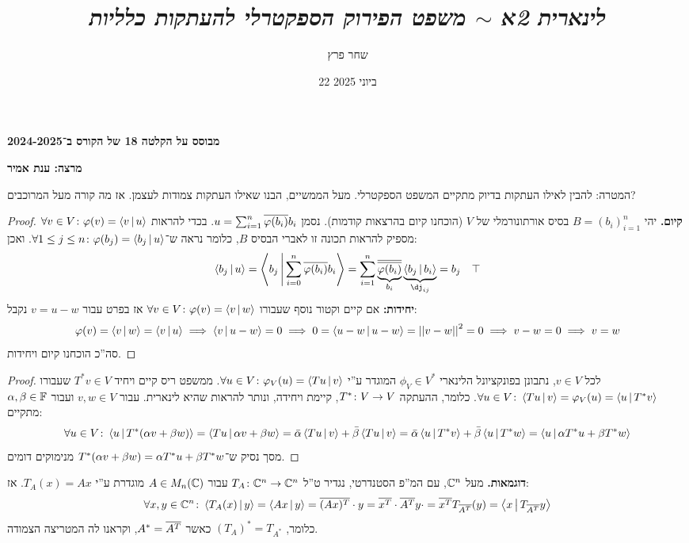 \documentclass[]{../../../../tex/classes/styledArticle}
\author{שחר פרץ}
\title{\textit{לינארית 2א $\sim$ משפט הפירוק הספקטרלי להעתקות כלליות}}
\date{22 ביוני 2025}
\begin{document}
	\maketitle
	\textbf{מבוסס על הקלטה 18 של הקורס ב־2024-2025}
	
	\textbf{מרצה: ענת אמיר}
	
	המטרה: להבין לאילו העתקות בדיוק מתקיים המשפט הספקטרלי. מעל הממשיים, הבנו שאילו העתקות צמודות לעצמן. אז מה קורה מעל המרוכבים? 
	
	\begin{proof}
		\textbf{קיום. }יהי $B = (b_i)_{i = 1}^{n}$ בסיס אורתונורמלי של $V$ (הוכחנו קיום בהרצאות קודמות). נסמן $u = \sum_{i =1}^{n}\overline{\varphi(b_i)} b_i$. בכדי להראות $\forall v \in V \colon \varphi(v) = \left \langle v \,\middle|\, u \right \rangle$ מספיק להראות תכונה זו לאברי הבסיס $B$, כלומר נראה ש־$\forall 1 \le j \le n \colon \varphi(b_j) = \left \langle b_j \,\middle|\, u \right \rangle$. ואכן: 
		\[ \mut{b_j}{u} = \mut{b_j}{\sumni \ol{\phi(b_i)}b_i} = \sum_{i = 1}^{n}\underbrace{\ol{\ol{\phi(b_i)}}}_{b_i}\underbrace{\mut{b_j}{b_i}}_{\dj_{ij}} = b_j \quad \top \]
		\textbf{יחידות: }אם קיים וקטור נוסף שעבורו $\forall v \in V \colon \varphi(v) = \left \langle v \,\middle|\, w \right \rangle$ אז בפרט עבור $v = u - w$ נקבל: 
		\[ \varphi(v) = \left \langle v \,\middle|\, w \right \rangle = \left \langle v \,\middle|\, u \right \rangle \implies \left \langle v \,\middle|\, u - w \right \rangle = 0 \implies 0 = \left \langle u - w \,\middle|\, u - w \right \rangle = \left \vert \left \vert v - w \right \vert \right \vert^{2} = 0 \implies v - w = 0 \implies v = w \]
		סה''כ הוכחנו קיום ויחידות. 
	\end{proof}
	
	\begin{proof}
		לכל $v \in V$, נתבונן בפונקציונל הלינארי $\phi_V \in V^*$ המוגדר ע''י $\forall u \in V \colon \varphi_V(u) = \left \langle Tu \,\middle|\, v \right \rangle$. ממשפט ריס קיים ויחיד $T^*v \in V$ שעבורו $\forall u \in V \colon \left \langle Tu \,\middle|\, v \right \rangle = \varphi_V(u) = \left \langle u \,\middle|\, T^*v \right \rangle$. כלומר, ההעתקה $T^* \colon V \to V$, קיימת ויחידה, ונותר להראות שהיא לינארית. עבור $v, w \in V$ ועבור $\alpha, \beta \in \mathbb{F}$ מתקיים: 
		\[ \forall u \in V \colon \left \langle u \,\middle|\, T^* (\alpha v + \beta w) \right \rangle = \left \langle Tu \,\middle|\, \alpha v + \beta w \right \rangle = \bar {\alpha} \left \langle Tu \,\middle|\, v \right \rangle + \bar {\beta} \left \langle Tu \,\middle|\, v \right \rangle = \bar {\alpha} \left \langle u \,\middle|\, T^* v \right \rangle + \bar {\beta} \left \langle u \,\middle|\, T^*w \right \rangle = \left \langle u \,\middle|\, \alpha T^*u + \beta T^*w \right \rangle \]
		מסך נסיק ש־$T^*(\alpha v + \beta w) = \alpha T^* u + \beta T^* w$ מנימוקים דומים. 
	\end{proof}
	
	\textbf{דוגמאות. }
		מעל $\mathbb{C}^n$, עם המ''פ הסטנדרטי, נגדיר ט''ל $T_A \colon \mathbb{C}^n \to \mathbb{C}^n$ עבור $A \in M_n(\mathbb{C})$ מוגדרת ע''י $T_A(x) = Ax$. אז: 
		\[ \forall x, y \in \mathbb{C}^n \colon \left \langle T_A(x) \,\middle|\, y \right \rangle = \left \langle Ax \,\middle|\, y \right \rangle = \overline{(Ax)^T} \cdot y = \overline{x^T}\cdot\overline{A^T}y\cdot = \overline{x^T}T_{\overline{A^T}}(y) = \left \langle x \,\middle|\, T_{\overline{A^T}}y \right \rangle \]
		כלומר, $(T_A)^* = T_{A^*}$ כאשר $A^* = \overline{A^T}$, וקראנו לה המטריצה הצמודה. 
	
\end{document}
